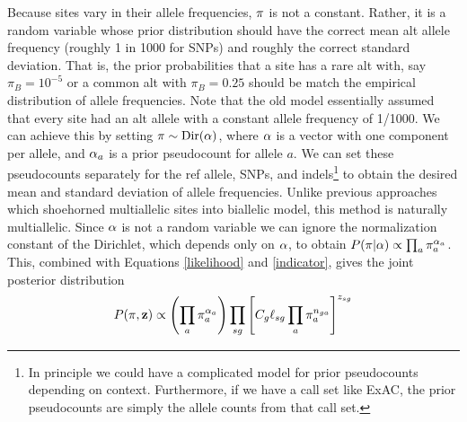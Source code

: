 \documentclass[nofootinbib,amssymb,amsmath]{revtex4}
\newcommand{\vz}{{\bf z}}
\newcommand{\vpi}{{\bf \pi}}
\newcommand{\valpha}{{\bf \alpha}}
\begin{document}
Because sites vary in their allele frequencies, $\vpi$ is not a constant.  Rather, it is a random variable whose prior distribution should have the correct mean alt allele frequency (roughly 1 in 1000 for SNPs) and roughly the correct standard deviation.  That is, the prior probabilities that a site has a rare alt with, say $\pi_B = 10^{-5}$ or a common alt with $\pi_B = 0.25$ should be match the empirical distribution of allele frequencies.  Note that the old model essentially assumed that every site had an alt allele with a constant allele frequency of 1/1000.  We can achieve this by setting $\vpi \sim {\rm Dir}(\valpha)$, where $\valpha$ is a vector with one component per allele, and $\valpha_a$ is a prior pseudocount for allele $a$.  We can set these pseudocounts separately for the ref allele, SNPs, and indels\footnote{In principle we could have a complicated model for prior pseudocounts depending on context.  Furthermore, if we have a call set like ExAC, the prior pseudocounts are simply the allele counts from that call set.} to obtain the desired mean and standard deviation of allele frequencies.  Unlike previous approaches which shoehorned multiallelic sites into  biallelic model, this method is naturally multiallelic.  Since $\valpha$ is not a random variable we can ignore the normalization constant of the Dirichlet, which depends only on $\valpha$, to obtain $P(\vpi | \valpha) \propto  \prod_a \pi_a^{\alpha_a}$.  This, combined with Equations \ref{likelihood} and \ref{indicator}, gives the joint posterior distribution
\begin{equation}
P(\vpi, \vz) \propto \left( \prod_a \pi_a^{\alpha_a} \right) \prod_{sg} \left[ C_g \ell_{sg} \prod_a \pi_a^{n_{ga}} \right]^{z_{sg}}
\end{equation}
\end{document}
